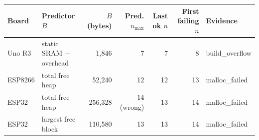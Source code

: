 \begin{tabular}{llrrrrl}
\hline
Board & Predictor $B$ & $B$ (bytes) & Pred. $n_{\max}$ & Last ok $n$ & First failing $n$ & Evidence \\
\hline
Uno R3 & static SRAM $-$ overhead & 1{,}846 & 7 & 7 & 8 & build\_overflow \\
ESP8266 & total free heap & 52{,}240 & 12 & 12 & 13 & malloc\_failed \\
ESP32 & total free heap & 256{,}328 & 14 (wrong) & 13 & 14 & malloc\_failed \\
ESP32 & largest free block & 110{,}580 & 13 & 13 & 14 & malloc\_failed \\
\hline
\end{tabular}
